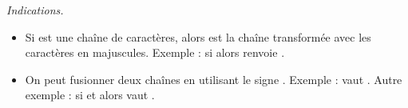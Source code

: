 \documentclass[11pt,class=report,crop=false]{standalone}
\begin{document}
\begin{activite}
\begin{enumerate}
\emph{Indications.} 
\begin{itemize}
  \item Si  est une chaîne de caractères, alors  est la chaîne transformée avec les caractères en majuscules. Exemple : si  alors  renvoie .
  
  \item {} On peut fusionner deux chaînes en utilisant le signe \og{}\ci{+}\fg{}. Exemple :  vaut .  Autre exemple : si  et  alors  vaut .
\end{itemize}
\end{enumerate}
\end{activite}


\end{document}
